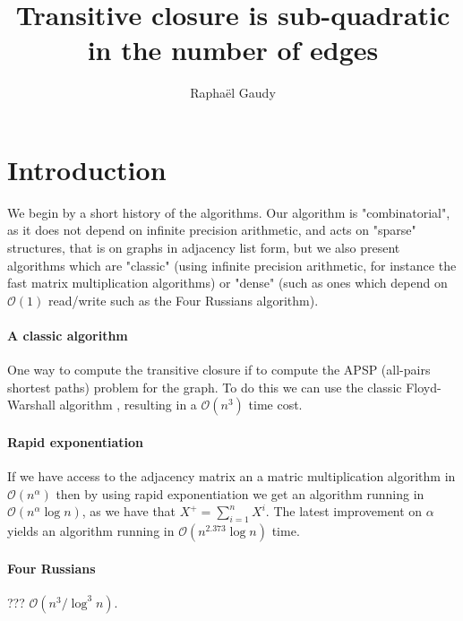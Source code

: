 \documentclass[11pt,a4paper]{article}
\title{Transitive closure is sub-quadratic in the number of edges}
\author{Raphaël Gaudy}
\newcommand{\BigO}{\mathcal O}
\theoremstyle{definition}
\begin{document}
\maketitle



\section{Introduction}

We begin by a short history of the algorithms. Our algorithm is
"combinatorial", as it does not depend on infinite precision arithmetic,
and acts on "sparse" structures, that is on graphs in adjacency list form,
but we also present algorithms which are  "classic" (using
infinite precision arithmetic, for instance the fast matrix
multiplication algorithms) or "dense"
(such as ones which depend on $\BigO(1)$ read/write such as the 
Four Russians algorithm).

\paragraph{A classic algorithm} One way to compute the transitive closure if to compute 
the APSP (all-pairs shortest 
paths) problem  for the graph.
To do this we can use   the classic
Floyd-Warshall algorithm \cite{Floyd:1962:A9S:367766.368168},
resulting in a $\BigO(n^3)$ time cost.

\paragraph{Rapid exponentiation}
If we have access to the adjacency matrix an a matric multiplication algorithm
in $\BigO(n^\alpha)$ then by using rapid exponentiation we get an algorithm
running in $\BigO(n^\alpha \log n)$, as we have that 
$X^+=\sum_{i=1}^n X^i$. The latest improvement on $\alpha$  \cite{DBLP:journals/corr/Gall14}
 yields
an algorithm running in $\BigO(n^{2.373}\log n)$ time.

\paragraph{Four Russians}
???
$\BigO(n^3/\log^3n)$.
\end{document}
